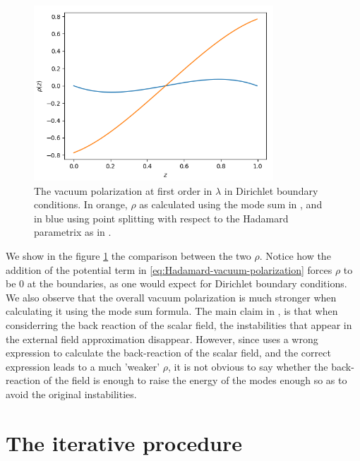\begin{figure}[t]
	\centering
	\includegraphics[width=0.8\textwidth]{figures/dirichlet/renormalization_comparison_rho.png}
	\caption{The vacuum polarization at first order in $\lambda$ in Dirichlet boundary conditions. In orange, $\rho$ as calculated using the mode sum in \cite{Ambjorn1983}, and in blue using point splitting with respect to the Hadamard parametrix as in \cite{Wernersson2020}. }
	\label{fig:perturbative-rho-comparison}
\end{figure}
We show in the figure \ref{fig:perturbative-rho-comparison} the comparison between the two $\rho$. Notice how the addition of the potential term in \eqref{eq:Hadamard-vacuum-polarization} forces $\rho$ to be 0 at the boundaries, as one would expect for Dirichlet boundary conditions. We also observe that the overall vacuum polarization is much stronger when calculating it using the mode sum formula. The main claim in  \cite{Ambjorn1983}, is that when considerring the back reaction of the scalar field, the instabilities that appear in the external field approximation disappear. However, since \cite{Ambjorn1983} uses a wrong expression to calculate the back-reaction of the scalar field, and the correct expression leads to a much 'weaker'  $\rho$, it is not obvious to say whether the back-reaction of the field is enough to raise the energy of the modes enough so as to avoid the original instabilities.
\section{The iterative procedure}

